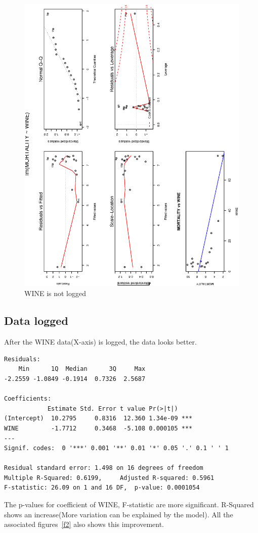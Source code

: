 \documentclass[a4paper,10pt]{article}
\begin{document}
\begin{figure}[p]
\includegraphics[angle=-90, width=1\textwidth]{figures/hw6_fig1.eps}
\caption{WINE is not logged}\label{f1}
\end{figure}

\subsection{Data logged}
After the WINE data(X-axis) is logged, the data looks better.
\begin{verbatim}
Residuals:
    Min      1Q  Median      3Q     Max
-2.2559 -1.0849 -0.1914  0.7326  2.5687

Coefficients:
            Estimate Std. Error t value Pr(>|t|)
(Intercept)  10.2795     0.8316  12.360 1.34e-09 ***
WINE         -1.7712     0.3468  -5.108 0.000105 ***
---
Signif. codes:  0 '***' 0.001 '**' 0.01 '*' 0.05 '.' 0.1 ' ' 1

Residual standard error: 1.498 on 16 degrees of freedom
Multiple R-Squared: 0.6199,     Adjusted R-squared: 0.5961
F-statistic: 26.09 on 1 and 16 DF,  p-value: 0.0001054
\end{verbatim}
The p-values for coefficient of WINE, F-statistic are more significant. R-Squared shows an increase(More variation can be explained by the model). All the associated figures~\ref{f2} also shows this improvement. 
\end{document}
